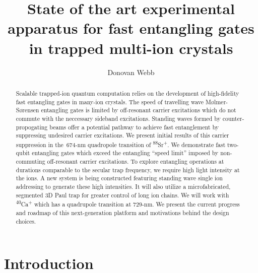 \documentclass[12pt]{iopart}
\begin{document}
\title[]{State of the art experimental apparatus for fast entangling gates in trapped multi-ion crystals}

\author{Donovan Webb}

\address{Department of Physics,
University of Oxford}

\begin{abstract}

    Scalable trapped-ion quantum computation relies on the development
    of high-fidelity fast entangling gates in many-ion crystals.
    The speed of travelling wave M\o lmer-S\o rensen entangling gates is limited
    by off-resonant carrier excitations which do not commute with the
    neccessary sideband excitations.
    Standing waves formed by counter-propogating beams offer a
    potential pathway to achieve fast entanglement by suppressing
    undesired carrier excitations.
    We present initial results of this carrier suppression in
    the~$674$-nm quadropole transition of
    \textsuperscript{88}Sr\textsuperscript{+}. We demonstrate fast
    two-qubit entangling gates which exceed the entangling ``speed
    limit'' imposed by non-commuting off-resonant carrier excitations.
    To explore entangling operations at durations comparable to the
    secular trap frequency, we require high light intensity at the ions.
    A new system is being constructed featuring standing
    wave single ion addressing to generate these high intensities.  It
    will also utilize a microfabricated, segmented 3D Paul trap for
    greater control of long ion chains. We will work with
    \textsuperscript{40}Ca\textsuperscript{+} which has a quadrupole
    transition at $729$-nm. We present the current progress and
    roadmap of this next-generation platform and motivations behind
    the design choices.

\end{abstract}

\section{Introduction}

\end{document}

